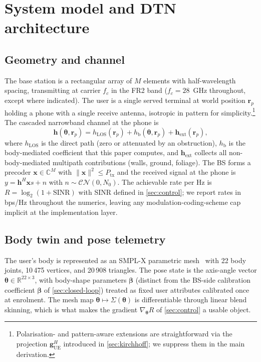 \documentclass[journal,twocolumn,10pt]{IEEEtran}
\theoremstyle{plain}
\theoremstyle{definition}
\theoremstyle{remark}
\newcommand{\rr}{\mathbf{r}}
\newcommand{\xx}{\mathbf{x}}
\newcommand{\hh}{\mathbf{h}}
\newcommand{\thetab}{\bm{\theta}}
\newcommand{\betab}{\bm{\beta}}
\newcommand{\hLOS}{h_{\mathrm{LOS}}}
\newcommand{\hbody}{h_{\mathrm{b}}}
\newcommand{\Complex}{\mathbb{C}}
\newcommand{\Reals}{\mathbb{R}}
\begin{document}
\section{System model and DTN architecture}\label{sec:arch}

\subsection{Geometry and channel}

The base station is a rectangular array of $M$ elements with
half-wavelength spacing, transmitting at carrier $f_c$ in the FR2
band ($f_c = 28$~GHz throughout, except where indicated). The user
is a single served terminal at world position $\rr_p$ holding a
phone with a single receive antenna, isotropic in pattern for
simplicity.\footnote{Polarisation- and pattern-aware extensions are
straightforward via the projection $\bm{g}_{\mathrm{UE}}^{H}$
introduced in \cref{sec:kirchhoff}; we suppress them in the main
derivation.} The cascaded narrowband channel at the phone is
\begin{equation}\label{eq:cascaded}
\hh(\thetab,\rr_p) = \hLOS(\rr_p) + \hbody(\thetab,\rr_p) +
\hh_{\mathrm{ext}}(\rr_p),
\end{equation}
where $\hLOS$ is the direct path (zero or attenuated by an
obstruction), $\hbody$ is the body-mediated coefficient that this
paper computes, and $\hh_{\mathrm{ext}}$ collects all
non-body-mediated multipath contributions (walls, ground, foliage).
The BS forms a precoder $\xx \in \Complex^{M}$ with $\|\xx\|^2 \leq
P_{\mathrm{tx}}$ and the received signal at the phone is $y = \hh^{H}
\xx s + n$ with $n \sim \mathcal{CN}(0, N_0)$. The achievable rate per Hz is
$R = \log_2(1 + \mathrm{SINR})$ with SINR defined in
\cref{sec:control}; we report rates in bps/Hz throughout the
numerics, leaving any modulation-coding-scheme cap implicit at the
implementation layer.

\subsection{Body twin and pose telemetry}

The user's body is represented as an SMPL-X parametric
mesh~\cite{SMPLX2019} with 22 body joints, 10\,475 vertices, and
20\,908 triangles. The pose state is the axis-angle vector $\thetab
\in \Reals^{22 \times 3}$, with body-shape parameters $\bm{\beta}$
(distinct from the BS-side calibration coefficient $\betab$ of
\cref{sec:closed-loop}) treated as fixed user attributes calibrated
once at enrolment. The mesh map $\thetab \mapsto
\Sigma(\thetab)$ is differentiable through linear blend skinning,
which is what makes the gradient $\nabla_{\thetab} R$ of
\cref{sec:control} a usable object.
\end{document}
